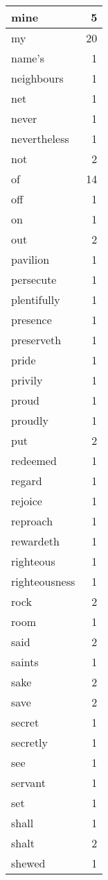 \begin{center}
\begin{longtable}{l|r}
mine & 5 \\ \hline
my & 20 \\ \hline
name's & 1 \\ \hline
neighbours & 1 \\ \hline
net & 1 \\ \hline
never & 1 \\ \hline
nevertheless & 1 \\ \hline
not & 2 \\ \hline
of & 14 \\ \hline
off & 1 \\ \hline
on & 1 \\ \hline
out & 2 \\ \hline
pavilion & 1 \\ \hline
persecute & 1 \\ \hline
plentifully & 1 \\ \hline
presence & 1 \\ \hline
preserveth & 1 \\ \hline
pride & 1 \\ \hline
privily & 1 \\ \hline
proud & 1 \\ \hline
proudly & 1 \\ \hline
put & 2 \\ \hline
redeemed & 1 \\ \hline
regard & 1 \\ \hline
rejoice & 1 \\ \hline
reproach & 1 \\ \hline
rewardeth & 1 \\ \hline
righteous & 1 \\ \hline
righteousness & 1 \\ \hline
rock & 2 \\ \hline
room & 1 \\ \hline
said & 2 \\ \hline
saints & 1 \\ \hline
sake & 2 \\ \hline
save & 2 \\ \hline
secret & 1 \\ \hline
secretly & 1 \\ \hline
see & 1 \\ \hline
servant & 1 \\ \hline
set & 1 \\ \hline
shall & 1 \\ \hline
shalt & 2 \\ \hline
shewed & 1 \\ \hline

\end{longtable}
\end{center}
